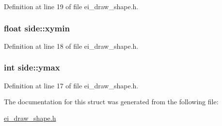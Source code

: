 Definition at line 19 of file ei\-\_\-draw\-\_\-shape.\-h.

\hypertarget{structside_a3cd67c5f19d85e6cd3f327a058e47478}{
\subsubsection[{xymin}]{\setlength{\rightskip}{0pt plus 5cm}float side\-::xymin}}\label{structside_a3cd67c5f19d85e6cd3f327a058e47478}


Definition at line 18 of file ei\-\_\-draw\-\_\-shape.\-h.

\hypertarget{structside_a8398a358cdcf0548f0c49e98cbf2075a}{
\subsubsection[{ymax}]{\setlength{\rightskip}{0pt plus 5cm}int side\-::ymax}}\label{structside_a8398a358cdcf0548f0c49e98cbf2075a}


Definition at line 17 of file ei\-\_\-draw\-\_\-shape.\-h.



The documentation for this struct was generated from the following file\-:\begin{DoxyCompactItemize}
\item 
\hyperlink{ei__draw__shape_8h}{ei\-\_\-draw\-\_\-shape.\-h}\end{DoxyCompactItemize}
